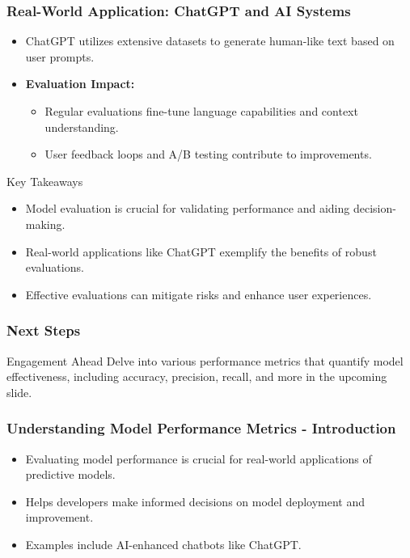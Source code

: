 \documentclass[aspectratio=169]{beamer}
\begin{document}
\begin{frame}[fragile]
    \frametitle{Real-World Application: ChatGPT and AI Systems}
    \begin{itemize}
        \item ChatGPT utilizes extensive datasets to generate human-like text based on user prompts.
        \item \textbf{Evaluation Impact:}
        \begin{itemize}
            \item Regular evaluations fine-tune language capabilities and context understanding.
            \item User feedback loops and A/B testing contribute to improvements.
        \end{itemize}
    \end{itemize}
    
    \begin{block}{Key Takeaways}
        \begin{itemize}
            \item Model evaluation is crucial for validating performance and aiding decision-making.
            \item Real-world applications like ChatGPT exemplify the benefits of robust evaluations.
            \item Effective evaluations can mitigate risks and enhance user experiences.
        \end{itemize}
    \end{block}
\end{frame}

\begin{frame}[fragile]
    \frametitle{Next Steps}
    \begin{block}{Engagement Ahead}
        Delve into various performance metrics that quantify model effectiveness, including accuracy, precision, recall, and more in the upcoming slide.
    \end{block}
\end{frame}

\begin{frame}[fragile]
    \frametitle{Understanding Model Performance Metrics - Introduction}
    \begin{itemize}
        \item Evaluating model performance is crucial for real-world applications of predictive models.
        \item Helps developers make informed decisions on model deployment and improvement.
        \item Examples include AI-enhanced chatbots like ChatGPT.
    \end{itemize}
\end{frame}
\end{document}
